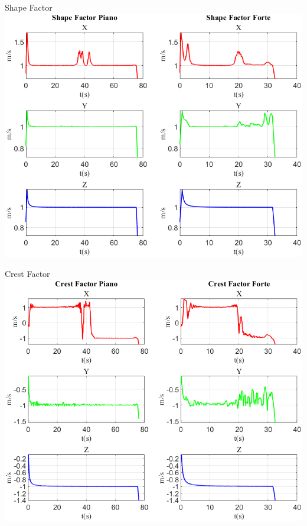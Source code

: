 	\begin{frame}{{Shape Factor}}
		\centering\includegraphics[height=.8\textheight]{figure/Vel/Shape Factor}
	\end{frame}
	
	\begin{frame}{{Crest Factor}}
		\centering\includegraphics[height=.8\textheight]{figure/Vel/Crest Factor}
	\end{frame}
	
